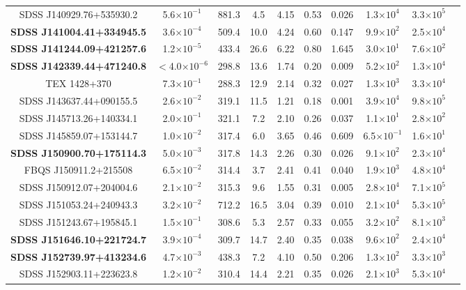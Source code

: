 \begin{table}
\begin{tabular}{|c| c| c| c| c| c| c| c| c|c|}
SDSS J140929.76+535930.2 	&	5.6$\times 10^{-1}$		&881.3			&4.5		&4.15		&0.53		&0.026		&1.3$\times 10^4$		&	3.3$\times 10^5$\\
\textbf{SDSS J141004.41+334945.5} 	&	3.6$\times 10^{-4}$		&509.4			&10.0	&4.24		&0.60		&0.147		&9.9$\times 10^2$		&	2.5$\times 10^4$\\
\textbf{SDSS J141244.09+421257.6} 	&	1.2$\times 10^{-5}$		&433.4			&26.6	&6.22		&0.80		&1.645		&3.0$\times 10^1$		&	7.6$\times 10^2$\\
\textbf{SDSS J142339.44+471240.8} 	&	$<$4.0$\times 10^{-6}$	&298.8			&13.6	&1.74		&0.20		&0.009		&5.2$\times 10^2$		&	1.3$\times 10^4$\\
TEX 1428+370             			&	7.3$\times 10^{-1}$		&288.3			&12.9	&2.14		&0.32		&0.027		&1.3$\times 10^3$		&	3.3$\times 10^4$\\
SDSS J143637.44+090155.5 	&	2.6$\times 10^{-2}$		&319.1			&11.5	&1.21		&0.18		&0.001		&3.9$\times 10^4$		&	9.8$\times 10^5$\\
SDSS J145713.26+140334.1 	&	2.0$\times 10^{-1}$		&321.1			&7.2		&2.10		&0.26		&0.037		&1.1$\times 10^1$		&	2.8$\times 10^2$\\
SDSS J145859.07+153144.7 	&	1.0$\times 10^{-2}$		&317.4			&6.0		&3.65		&0.46		&0.609		&6.5$\times 10^{-1}$	&	1.6$\times 10^{1}$\\
\textbf{SDSS J150900.70+175114.3} 	&	5.0$\times 10^{-3}$		&317.8			&14.3	&2.26		&0.30		&0.026		&9.1$\times 10^2$		&	2.3$\times 10^4$\\
FBQS J150911.2+215508    	&	6.5$\times 10^{-2}$		&314.4			&3.7		&2.41		&0.41		&0.040		&1.9$\times 10^3$		&	4.8$\times 10^4$\\
SDSS J150912.07+204004.6 	&	2.1$\times 10^{-2}$		&315.3			&9.6		&1.55		&0.31		&0.005		&2.8$\times 10^4$		&	7.1$\times 10^5$\\
SDSS J151053.24+240943.3 	&	3.2$\times 10^{-2}$		&712.2			&16.5	&3.04		&0.39		&0.010		&2.1$\times 10^4$		&	5.3$\times 10^5$\\
SDSS J151243.67+195845.1 	&	1.5$\times 10^{-1}$		&308.6			&5.3		&2.57		&0.33		&0.055		&3.2$\times 10^2$		&	8.1$\times 10^3$\\
\textbf{SDSS J151646.10+221724.7} 	&	3.9$\times 10^{-4}$		&309.7			&14.7	&2.40		&0.35		&0.038		&9.6$\times 10^2$		&	2.4$\times 10^4$\\
\textbf{SDSS J152739.97+413234.6} 	&	4.7$\times 10^{-3}$		&438.3			&7.2		&4.10		&0.50		&0.206		&1.3$\times 10^2$		&	3.3$\times 10^3$\\
SDSS J152903.11+223623.8 	&	1.2$\times 10^{-2}$		&310.4			&14.4	&2.21		&0.35		&0.026		&2.1$\times 10^3$		&	5.3$\times 10^4$\\

\end{tabular}
\end{table}
